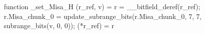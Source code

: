 function _set_Misa_H (r_ref, v) = {
    r = __bitfield_deref(r_ref);
    r.Misa_chunk_0 = update_subrange_bits(r.Misa_chunk_0, 7, 7, subrange_bits(v, 0, 0));
    (*r_ref) = r
}

